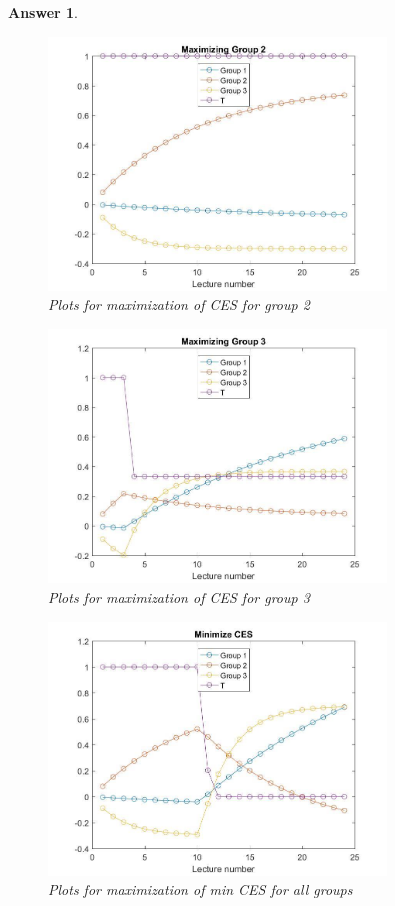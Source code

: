 \documentclass[12pt]{article}
\theoremstyle{colon}
\newtheorem*{answer}{Answer}
\begin{document}
\begin{answer}
  \begin{figure}[ht]
    \caption{Plots for maximization of CES for group 2}
    \centering
      \includegraphics[width=0.8\textwidth]{group2.jpg}
  \end{figure}

  \begin{figure}[ht]
    \caption{Plots for maximization of CES for group 3}
    \centering
      \includegraphics[width=0.8\textwidth]{group3.jpg}
  \end{figure}

  \begin{figure}[ht]
    \caption{Plots for maximization of min CES for all groups}
    \centering
      \includegraphics[width=0.8\textwidth]{minCES.jpg}
  \end{figure}


\end{answer}
\end{document}
